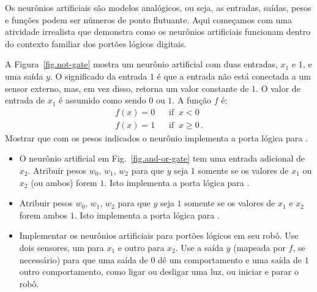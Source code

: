 Os neurônios artificiais são modelos analógicos, ou seja, as entradas, saídas, pesos e funções podem ser números de ponto flutuante. Aqui começamos com uma atividade irrealista que demonstra como os neurônios artificiais funcionam dentro do contexto familiar dos portões lógicos digitais.

A Figura~\ref{fig.not-gate} mostra um neurônio artificial com duas entradas, $x_1$ e $1$, e uma saída $y$. O significado da entrada $1$ é que a entrada não está conectada a um sensor externo, mas, em vez disso, retorna um valor constante de $1$. O valor de entrada de $x_1$ é assumido como sendo $0$ ou $1$. A função $f$ é:
\[
\begin{array}{ll}
f(x) = 0 & \;\;\;\textrm{if} \;\; x < 0\\
f(x) = 1 & \;\;\;\textrm{if} \;\; x \geq 0\,.
\end{array}
\]
Mostrar que com os pesos indicados o neurônio implementa a porta lógica para .

\begin{framed}
\begin{itemize}
\item O neurônio artificial em Fig.~\ref{fig.and-or-gate} tem uma entrada adicional de $x_2$. Atribuir pesos $w_0$, $w_1$, $w_2$ para que $y$ seja $1$ somente se os valores de $x_1$ ou $x_2$ (ou ambos) forem $1$. Isto implementa a porta lógica para  .
\item Atribuir pesos $w_0$, $w_1$, $w_2$ para que $y$ seja $1$ somente se os valores de $x_1$ e $x_2$ forem ambos $1$. Isto implementa a porta lógica para .
\item Implementar os neurônios artificiais para portões lógicos em seu robô. Use dois sensores, um para $x_1$ e outro para $x_2$. Use a saída $y$ (mapeada por $f$, se necessário) para que uma saída de $0$ dê um comportamento e uma saída de $1$ outro comportamento, como ligar ou desligar uma luz, ou iniciar e parar o robô.
\end{itemize}
\end{framed}

